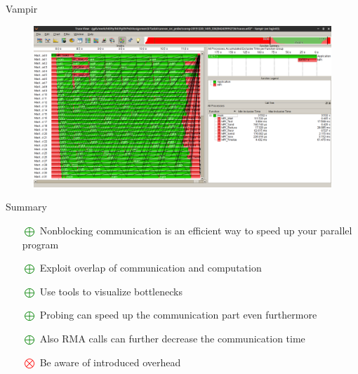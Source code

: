 \documentclass[9pt,pdftex]{beamer}
\begin{document}
\begin{frame}{Vampir}
{\begin{figure}
\includegraphics[width=1\textwidth]{Pictures/Nonblocking_algorithm_probe.png}
\end{figure}
}
\end{frame}

\begin{frame}{Summary}
\begin{itemize}
\item[\textcolor{green}{$\bigoplus$}] Nonblocking communication is an efficient way to speed up your parallel program
\item[\textcolor{green}{$\bigoplus$}] Exploit overlap of communication and computation
\item[\textcolor{green}{$\bigoplus$}] Use tools to visualize bottlenecks
\item[\textcolor{green}{$\bigoplus$}] Probing can speed up the communication part even furthermore
\item[\textcolor{green}{$\bigoplus$}] Also RMA calls can further decrease the communication time
\item[\textcolor{red}{$\bigotimes$}] Be aware of introduced overhead
\end{itemize}
\end{frame}
\end{document}

